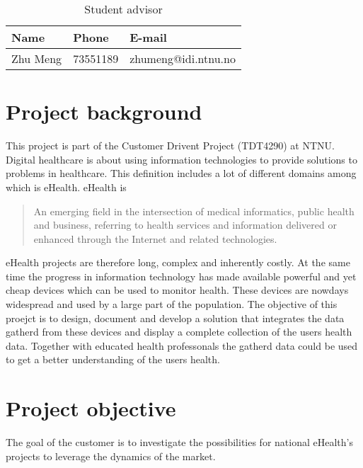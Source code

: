 \begin{table}
\begin{center}
\begin{tabular}{ l | l | l }
  \hline
  Name & Phone & E-mail \\
  \hline\noalign{\smallskip}\noalign{\smallskip}\hline
  Zhu Meng	& 73551189 & zhumeng@idi.ntnu.no \\
  \hline
\end{tabular}
\end{center}
\caption{Student advisor}
\label{table:advisor}
\end{table}


\newpage
\section{Project background}
\label{section:background}

This project is part of the Customer Drivent Project (TDT4290) at NTNU.
Digital healthcare is about using information technologies to provide solutions to problems in healthcare. This definition includes a lot of different domains among which is eHealth. eHealth is
\begin{quote}
An emerging field in the intersection of medical informatics, public health and business, referring to health services and information delivered or enhanced through the Internet and related technologies.\citep{ehealth}
\end{quote}
eHealth projects are therefore long, complex and inherently costly. At the same time the progress in information technology has made available powerful and yet cheap devices which can be used to monitor health. These devices are nowdays widespread and used by a large part of the population. The objective of this proejct is to design, document and develop a solution that integrates the data gatherd from these devices and display a complete collection of the users health data. Together with educated health professonals the gatherd data could be used to get a better understanding of the users health.

\section{Project objective}
\label{section:objective}

The goal of the customer is to investigate the possibilities for national eHealth's projects to leverage the dynamics of the market.

